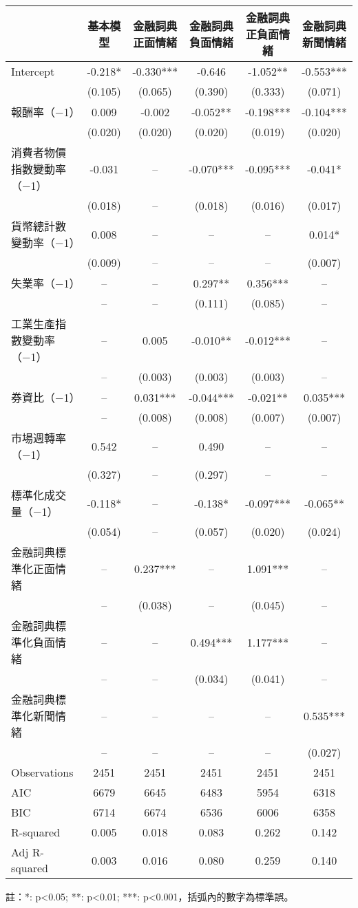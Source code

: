 \documentclass{article}
\begin{document}
    \fontsize{12pt}{14pt}\selectfont
    
    \begin{tabular}{lccccc}
\toprule
 & 基本模型 & \makecell{金融詞典\\正面情緒} & \makecell{金融詞典\\負面情緒} & \makecell{金融詞典\\正負面情緒} & \makecell{金融詞典\\新聞情緒} \\
\midrule
Intercept & -0.218* & -0.330*** & -0.646 & -1.052** & -0.553*** \\
 & (0.105) & (0.065) & (0.390) & (0.333) & (0.071) \\
報酬率（−1） & 0.009 & -0.002 & -0.052** & -0.198*** & -0.104*** \\
 & (0.020) & (0.020) & (0.020) & (0.019) & (0.020) \\
消費者物價指數變動率（−1） & -0.031 & -- & -0.070*** & -0.095*** & -0.041* \\
 & (0.018) & -- & (0.018) & (0.016) & (0.017) \\
貨幣總計數變動率（−1） & 0.008 & -- & -- & -- & 0.014* \\
 & (0.009) & -- & -- & -- & (0.007) \\
失業率（−1） & -- & -- & 0.297** & 0.356*** & -- \\
 & -- & -- & (0.111) & (0.085) & -- \\
工業生產指數變動率（−1） & -- & 0.005 & -0.010** & -0.012*** & -- \\
 & -- & (0.003) & (0.003) & (0.003) & -- \\
券資比（−1） & -- & 0.031*** & -0.044*** & -0.021** & 0.035*** \\
 & -- & (0.008) & (0.008) & (0.007) & (0.007) \\
市場週轉率（−1） & 0.542 & -- & 0.490 & -- & -- \\
 & (0.327) & -- & (0.297) & -- & -- \\
標準化成交量（−1） & -0.118* & -- & -0.138* & -0.097*** & -0.065** \\
 & (0.054) & -- & (0.057) & (0.020) & (0.024) \\
金融詞典標準化正面情緒 & -- & 0.237*** & -- & 1.091*** & -- \\
 & -- & (0.038) & -- & (0.045) & -- \\
金融詞典標準化負面情緒 & -- & -- & 0.494*** & 1.177*** & -- \\
 & -- & -- & (0.034) & (0.041) & -- \\
金融詞典標準化新聞情緒 & -- & -- & -- & -- & 0.535*** \\
 & -- & -- & -- & -- & (0.027) \\
\midrule
Observations &   2451 &   2451 &   2451 &   2451 &   2451 \\
AIC &    6679 &    6645 &    6483 &    5954 &    6318 \\
BIC &    6714 &    6674 &    6536 &    6006 &    6358 \\
R-squared &    0.005 &    0.018 &    0.083 &    0.262 &    0.142 \\
Adj R-squared &    0.003 &    0.016 &    0.080 &    0.259 &    0.140 \\
\bottomrule
\end{tabular}

    
    \fontsize{11pt}{14pt}\selectfont
    註：*: p<0.05; **: p<0.01; ***: p<0.001，括弧內的數字為標準誤。
    
\end{document}
